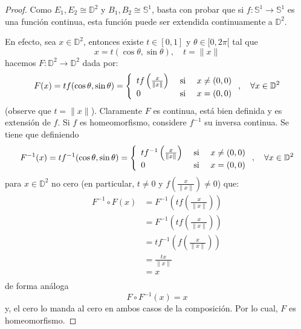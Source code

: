 \documentclass{article}
\newcounter{it}
\theoremstyle{largebreak}
\newcommand\cf[3]{\ensuremath{#1:#2\rightarrow#3}}
\begin{document}
    \begin{proof}
        Como $E_1,E_2\cong\mathbb{D}^2$ y $B_1,B_2\cong\mathbb{S}^1$, basta con probar que si $\cf{f}{\mathbb{S}^1}{\mathbb{S}^1}$ es una función continua, esta función puede ser extendida continuamente a $\mathbb{D}^2$.

        En efecto, sea $x\in\mathbb{D}^2$, entonces existe $t\in[0,1]$ y $\theta\in[0,2\pi[$ tal que
        \begin{equation*}
            x=t(\cos\theta,\sin\theta),\quad t=\|x\|
        \end{equation*}
        hacemos $\cf{F}{\mathbb{D}^2}{\mathbb{D}^2}$ dada por:
        \begin{equation*}
            F(x)=tf(\cos\theta,\sin\theta)=\left\{
                \begin{array}{lcr}
                    tf\left(\frac{x}{\|x\|}\right) & \textup{ si } & x\neq(0,0)\\
                    0 & \textup{ si } & x=(0,0)\\
                \end{array}
            \right.,\quad\forall x\in\mathbb{D}^2
        \end{equation*}
        (observe que $t=\|x\|$). Claramente $F$ es continua, está bien definida y es extensión de $f$. Si $f$ es homeomorfismo, considere $f^{-1}$ su inversa continua. Se tiene que definiendo
        \begin{equation*}
            F^{-1}(x)=tf^{-1}(\cos\theta,\sin\theta)=\left\{
                \begin{array}{lcr}
                    tf^{-1}\left(\frac{x}{\|x\|}\right) & \textup{ si } & x\neq(0,0)\\
                    0 & \textup{ si } & x=(0,0)\\
                \end{array}
            \right.,\quad\forall x\in\mathbb{D}^2
        \end{equation*}
        para $x\in\mathbb{D}^2$ no cero (en particular, $t\neq 0$ y $f\left(\frac{x}{\|x\|}\right)\neq0$) que:
        \begin{equation*}
            \begin{split}
                F^{-1}\circ F(x)&=F^{-1}\left(tf\left(\frac{x}{\|x\|}\right)\right)\\
                &=F^{-1}\left(tf\left(\frac{x}{\|x\|}\right)\right)\\
                &=t f^{-1}\left(f\left(\frac{x}{\|x\|}\right)\right)\\
                &=\frac{tx}{\|x\|}\\
                &=x\\
            \end{split}
        \end{equation*}
        de forma análoga
        \begin{equation*}
            F\circ F^{-1}(x)=x
        \end{equation*}
        y, el cero lo manda al cero en ambos casos de la composición. Por lo cual, $F$ es homeomorfismo.
    \end{proof}
\end{document}
